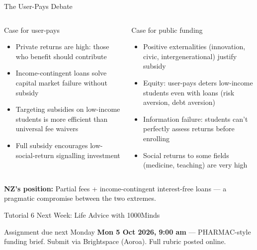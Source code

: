 \documentclass[aspectratio=169, 12pt]{beamer}
\begin{document}
\begin{frame}{The User-Pays Debate}
  \begin{columns}
      \begin{block}{Case for user-pays}
        \footnotesize
        \begin{itemize}
          \item Private returns are high: those who benefit should contribute
          \item Income-contingent loans solve capital market failure without subsidy
          \item Targeting subsidies on low-income students is more efficient than universal fee waivers
          \item Full subsidy encourages low-social-return signalling investment
        \end{itemize}
      \end{block}
      \begin{alertblock}{Case for public funding}
        \footnotesize
        \begin{itemize}
          \item Positive externalities (innovation, civic, intergenerational) justify subsidy
          \item Equity: user-pays deters low-income students even with loans (risk aversion, debt aversion)
          \item Information failure: students can't perfectly assess returns before enrolling
          \item Social returns to some fields (medicine, teaching) are very high
        \end{itemize}
      \end{alertblock}
  \end{columns}
  \vspace{0.15em}
  \footnotesize \textbf{NZ's position:} Partial fees + income-contingent interest-free loans --- a pragmatic compromise between the two extremes.
\end{frame}

\begin{frame}{Tutorial 6 Next Week: Life Advice with 1000Minds}
  \vspace{0.15em}
  \begin{alertblock}{Assignment due next Monday}
    \small \textbf{Mon 5 Oct 2026, 9:00 am} --- PHARMAC-style funding brief. Submit via Brightspace (Aoroa). Full rubric posted online.
  \end{alertblock}
\end{frame}
\end{document}
